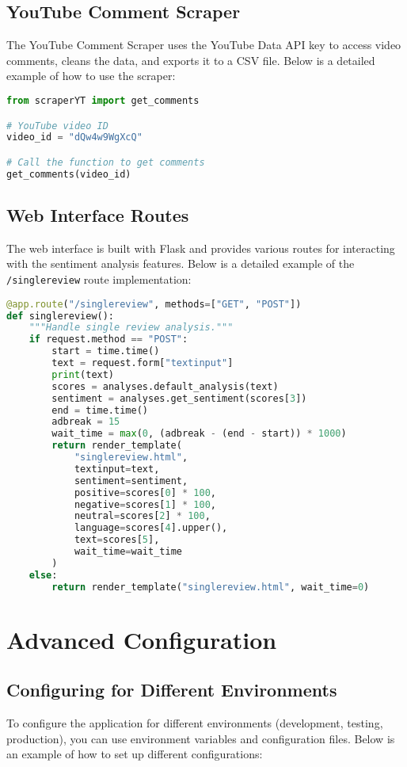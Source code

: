 \documentclass[a4paper]{article}
\begin{document}
\subsection{YouTube Comment Scraper}
The YouTube Comment Scraper uses the YouTube Data API key to access video comments, cleans the data, and exports it to a CSV file. Below is a detailed example of how to use the scraper:

\begin{lstlisting}[language=python]
from scraperYT import get_comments

# YouTube video ID
video_id = "dQw4w9WgXcQ"

# Call the function to get comments
get_comments(video_id)
\end{lstlisting}

\subsection{Web Interface Routes}
The web interface is built with Flask and provides various routes for interacting with the sentiment analysis features. Below is a detailed example of the \texttt{/singlereview} route implementation:

\begin{lstlisting}[language=python]
@app.route("/singlereview", methods=["GET", "POST"])
def singlereview():
    """Handle single review analysis."""
    if request.method == "POST":
        start = time.time()
        text = request.form["textinput"]
        print(text)
        scores = analyses.default_analysis(text)
        sentiment = analyses.get_sentiment(scores[3])
        end = time.time()
        adbreak = 15
        wait_time = max(0, (adbreak - (end - start)) * 1000)
        return render_template(
            "singlereview.html", 
            textinput=text, 
            sentiment=sentiment, 
            positive=scores[0] * 100, 
            negative=scores[1] * 100, 
            neutral=scores[2] * 100, 
            language=scores[4].upper(), 
            text=scores[5], 
            wait_time=wait_time
        )
    else:
        return render_template("singlereview.html", wait_time=0)
\end{lstlisting}

\section{Advanced Configuration}
\subsection{Configuring for Different Environments}
To configure the application for different environments (development, testing, production), you can use environment variables and configuration files. Below is an example of how to set up different configurations:
\end{document}
